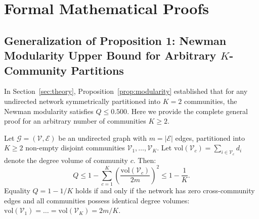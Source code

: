 
\section{Formal Mathematical Proofs}
\label{app:proofs}

\subsection{Generalization of Proposition 1: Newman Modularity Upper Bound for Arbitrary $K$-Community Partitions}
\label{app:proof_modularity}

In Section~\ref{sec:theory}, Proposition~\ref{prop:modularity} established that for any undirected network symmetrically partitioned into $K=2$ communities, the Newman modularity satisfies $Q \leq 0.500$. Here we provide the complete general proof for an arbitrary number of communities $K \geq 2$.

\begin{theorem}
\label{thm:general_modularity}
Let $\mathcal{G} = (\mathcal{V}, \mathcal{E})$ be an undirected graph with $m = |\mathcal{E}|$ edges, partitioned into $K \geq 2$ non-empty disjoint communities $\mathcal{V}_1, \dots, \mathcal{V}_K$. Let $\mathrm{vol}(\mathcal{V}_c) = \sum_{i \in \mathcal{V}_c} d_i$ denote the degree volume of community $c$. Then:
\begin{equation}
    Q \leq 1 - \sum_{c=1}^K \left( \frac{\mathrm{vol}(\mathcal{V}_c)}{2m} \right)^2 \leq 1 - \frac{1}{K}.
\end{equation}
Equality $Q = 1 - 1/K$ holds if and only if the network has zero cross-community edges and all communities possess identical degree volumes: $\mathrm{vol}(\mathcal{V}_1) = \dots = \mathrm{vol}(\mathcal{V}_K) = 2m/K$.
\end{theorem}

